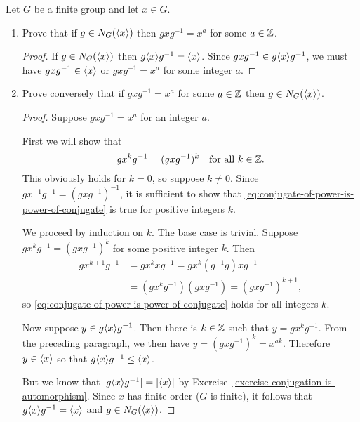  Let $G$ be a finite group and let $x\in G$.
\begin{enumerate}
\item Prove that if $g\in N_G(\langle{x}\rangle)$ then $gxg^{-1} = x^a$ for some
  $a\in\mathbb{Z}$.
  \begin{proof}
    If $g\in N_G(\langle{x}\rangle)$ then $g\langle{x}\rangle g^{-1} = \langle{x}\rangle$. Since
    $gxg^{-1}\in g\langle{x}\rangle g^{-1}$, we must have $gxg^{-1}\in\langle{x}\rangle$ or
    $gxg^{-1} = x^a$ for some integer $a$.
  \end{proof}
\item Prove conversely that if $gxg^{-1} = x^a$ for some $a\in\mathbb{Z}$ then
  $g\in N_G(\langle{x}\rangle)$.
  \begin{proof}
    Suppose $gxg^{-1} = x^a$ for an integer $a$.

    First we will show that
    \begin{equation}
      \label{eq:conjugate-of-power-is-power-of-conjugate}
      gx^kg^{-1} = (gxg^{-1})^k
      \quad\text{for all $k\in\mathbb{Z}$}.
    \end{equation}
    This obviously holds for $k = 0$, so suppose $k\neq0$. Since
    $gx^{-1}g^{-1} = (gxg^{-1})^{-1}$, it is sufficient to show that
    \eqref{eq:conjugate-of-power-is-power-of-conjugate} is true for
    positive integers $k$.

    We proceed by induction on $k$. The base case is trivial. Suppose
    $gx^kg^{-1} = (gxg^{-1})^k$ for some positive integer $k$. Then
    \begin{align*}
      gx^{k+1}g^{-1}
      &= gx^kxg^{-1} = gx^k(g^{-1}g)xg^{-1} \\
      &= (gx^kg^{-1})(gxg^{-1}) = (gxg^{-1})^{k+1},
    \end{align*}
    so \eqref{eq:conjugate-of-power-is-power-of-conjugate} holds for
    all integers $k$.

    Now suppose $y\in g\langle{x}\rangle g^{-1}$. Then there is $k\in\mathbb{Z}$ such
    that $y = gx^kg^{-1}$. From the preceding paragraph, we then have
    $y = (gxg^{-1})^k = x^{ak}$. Therefore $y\in\langle{x}\rangle$ so that
    $g\langle{x}\rangle g^{-1}\leq\langle{x}\rangle$.

    But we know that $\lvert{g\langle{x}\rangle g^{-1}}\rvert = \lvert{\langle{x}\rangle}\rvert$ by
    Exercise~\ref{exercise-conjugation-is-automorphism}. Since $x$ has
    finite order ($G$ is finite), it follows that
    $g\langle{x}\rangle g^{-1} = \langle{x}\rangle$ and $g\in N_G(\langle{x}\rangle)$.
  \end{proof}
\end{enumerate}
